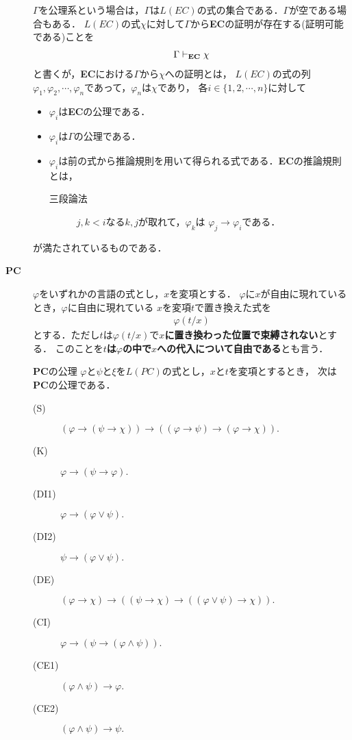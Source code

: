 \begin{description}
	$\Gamma$を公理系という場合は，$\Gamma$は$L(EC)$の式の集合である．$\Gamma$が空である場合もある．
	$L(EC)$の式$\chi$に対して$\Gamma$から{\bf EC}の証明が存在する(証明可能である)ことを
	\begin{align}
		\Gamma \vdash_{{\scriptsize \mbox{{\bf EC}}}} \chi
	\end{align}
	と書くが，{\bf EC}における$\Gamma$から$\chi$への証明とは，
	$L(EC)$の式の列$\varphi_{1},\varphi_{2},
	\cdots,\varphi_{n}$であって，$\varphi_{n}$は$\chi$であり，
	各$i \in \{1,2,\cdots,n\}$に対して
	\begin{itemize}
		\item $\varphi_{i}$は{\bf EC}の公理である．
		\item $\varphi_{i}$は$\Gamma$の公理である．
		\item $\varphi_{i}$は前の式から推論規則を用いて得られる式である．{\bf EC}の推論規則とは，
			\begin{description}
			\item[三段論法]
				$j,k < i$なる$k,j$が取れて，$\varphi_{k}$は
				$\varphi_{j} \rightarrow \varphi_{i}$である．
		\end{description} 
	\end{itemize}
	が満たされているものである．
	
	\item[{\bf PC}]
	$\varphi$をいずれかの言語の式とし，$x$を変項とする．
	$\varphi$に$x$が自由に現れているとき，$\varphi$に自由に現れている
	$x$を変項$t$で置き換えた式を
	\begin{align}
		\varphi(t/x)
	\end{align}
	とする．ただし$t$は$\varphi(t/x)$で{\bf $x$に置き換わった位置で束縛されない}とする．
	このことを{\bf $t$は$\varphi$の中で$x$への代入について自由である}とも言う．
	
	\begin{itembox}[l]{{\bf PC}の公理}
		$\varphi$と$\psi$と$\xi$を$L(PC)$の式とし，$x$と$t$を変項とするとき，
		次は{\bf PC}の公理である．
		\begin{description}
			\item[(S)] $(\varphi \rightarrow (\psi \rightarrow \chi)) 
				\rightarrow ((\varphi \rightarrow \psi)
				\rightarrow (\varphi \rightarrow \chi)).$
			\item[(K)] $\varphi \rightarrow (\psi \rightarrow \varphi).$
			\item[(DI1)] $\varphi \rightarrow (\varphi \vee \psi).$
			\item[(DI2)] $\psi \rightarrow (\varphi \vee \psi).$
			\item[(DE)] $(\varphi \rightarrow \chi) \rightarrow 
				((\psi \rightarrow \chi) \rightarrow ((\varphi \vee \psi) \rightarrow \chi)).$
			\item[(CI)] $\varphi \rightarrow (\psi \rightarrow (\varphi \wedge \psi)).$
			\item[(CE1)] $(\varphi \wedge \psi) \rightarrow \varphi.$
			\item[(CE2)] $(\varphi \wedge \psi) \rightarrow \psi.$
			

\end{description}
\end{itembox}
\end{description}

